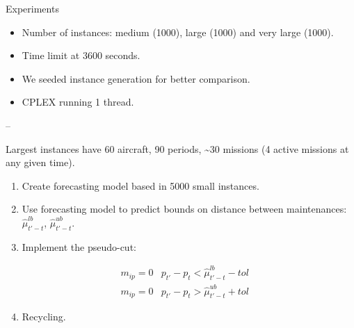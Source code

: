 \begin{frame}

\begin{block}{Experiments}

\begin{itemize}[<+->]

\item
  Number of instances: medium (1000), large (1000) and very large
  (1000).
\item
  Time limit at 3600 seconds.
\item
  We seeded instance generation for better comparison.
\item
  CPLEX running 1 thread.
\end{itemize}

--

Largest instances have 60 aircraft, 90 periods, \textasciitilde{}30
missions (4 active missions at any given time).

\begin{enumerate}[<+->]

\item
  Create forecasting model based in 5000 small instances.
\item
  Use forecasting model to predict bounds on distance between
  maintenances: \(\hat{\mu}_{t'-t}^{lb}\), \(\hat{\mu}_{t'-t}^{ub}\).
\item
  Implement the pseudo-cut:
\end{enumerate}

\begin{align}
    & m_{ip} = 0 & p_{t'} - p_t < \hat{\mu}_{t'-t}^{lb} - tol \label{eq:dist_lb} \\
    & m_{ip} = 0  &  p_{t'} - p_t > \hat{\mu}_{t'-t}^{ub} + tol \label{eq:dist_ub}
\end{align}

\begin{enumerate}[<+->]
\setcounter{enumi}{3}

\item
  Recycling.
\end{enumerate}

\end{block}

\end{frame}

